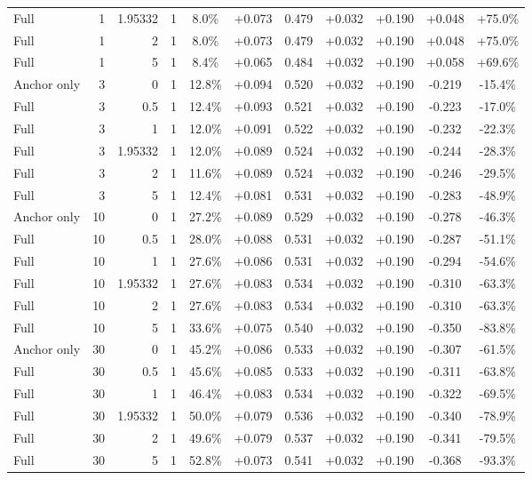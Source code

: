 \begin{table}[htbp]
\begin{tabular}{lrrrccccccc}
Full & 1 & 1.95332 & 1 & 8.0\% & +0.073 & 0.479 & +0.032 & +0.190 & +0.048 & +75.0\% \\
Full & 1 & 2 & 1 & 8.0\% & +0.073 & 0.479 & +0.032 & +0.190 & +0.048 & +75.0\% \\
Full & 1 & 5 & 1 & 8.4\% & +0.065 & 0.484 & +0.032 & +0.190 & +0.058 & +69.6\% \\
Anchor only & 3 & 0 & 1 & 12.8\% & +0.094 & 0.520 & +0.032 & +0.190 & -0.219 & -15.4\% \\
Full & 3 & 0.5 & 1 & 12.4\% & +0.093 & 0.521 & +0.032 & +0.190 & -0.223 & -17.0\% \\
Full & 3 & 1 & 1 & 12.0\% & +0.091 & 0.522 & +0.032 & +0.190 & -0.232 & -22.3\% \\
Full & 3 & 1.95332 & 1 & 12.0\% & +0.089 & 0.524 & +0.032 & +0.190 & -0.244 & -28.3\% \\
Full & 3 & 2 & 1 & 11.6\% & +0.089 & 0.524 & +0.032 & +0.190 & -0.246 & -29.5\% \\
Full & 3 & 5 & 1 & 12.4\% & +0.081 & 0.531 & +0.032 & +0.190 & -0.283 & -48.9\% \\
Anchor only & 10 & 0 & 1 & 27.2\% & +0.089 & 0.529 & +0.032 & +0.190 & -0.278 & -46.3\% \\
Full & 10 & 0.5 & 1 & 28.0\% & +0.088 & 0.531 & +0.032 & +0.190 & -0.287 & -51.1\% \\
Full & 10 & 1 & 1 & 27.6\% & +0.086 & 0.531 & +0.032 & +0.190 & -0.294 & -54.6\% \\
Full & 10 & 1.95332 & 1 & 27.6\% & +0.083 & 0.534 & +0.032 & +0.190 & -0.310 & -63.3\% \\
Full & 10 & 2 & 1 & 27.6\% & +0.083 & 0.534 & +0.032 & +0.190 & -0.310 & -63.3\% \\
Full & 10 & 5 & 1 & 33.6\% & +0.075 & 0.540 & +0.032 & +0.190 & -0.350 & -83.8\% \\
Anchor only & 30 & 0 & 1 & 45.2\% & +0.086 & 0.533 & +0.032 & +0.190 & -0.307 & -61.5\% \\
Full & 30 & 0.5 & 1 & 45.6\% & +0.085 & 0.533 & +0.032 & +0.190 & -0.311 & -63.8\% \\
Full & 30 & 1 & 1 & 46.4\% & +0.083 & 0.534 & +0.032 & +0.190 & -0.322 & -69.5\% \\
Full & 30 & 1.95332 & 1 & 50.0\% & +0.079 & 0.536 & +0.032 & +0.190 & -0.340 & -78.9\% \\
Full & 30 & 2 & 1 & 49.6\% & +0.079 & 0.537 & +0.032 & +0.190 & -0.341 & -79.5\% \\
Full & 30 & 5 & 1 & 52.8\% & +0.073 & 0.541 & +0.032 & +0.190 & -0.368 & -93.3\% \\

\end{tabular}
\end{table}
